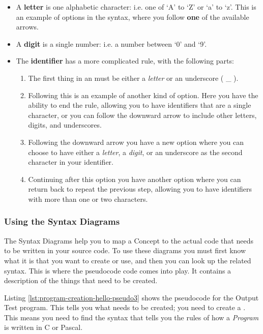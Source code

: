 \begin{itemize}
  \item A \textbf{letter} is one alphabetic character: i.e. one of `A' to `Z' or `a' to `z'. This is an example of options in the syntax, where you follow \textbf{one} of the available arrows.
  \item A \textbf{digit} is a single number: i.e. a number between `0' and `9'.
  
  \item The \textbf{identifier} has a more complicated rule, with the following parts:
  \begin{enumerate}
    \item The first thing in an  must be either a \emph{letter} or an underscore ( \_ ).
    \item Following this is an example of another kind of option. Here you have the ability to end the rule, allowing you to have identifiers that are a single character, or you can follow the downward arrow to include other letters, digits, and underscores.
    \item Following the downward arrow you have a new option where you can choose to have either a \emph{letter}, a \emph{digit}, or an underscore as the second character in your identifier.
    \item Continuing after this option you have another option where you can return back to repeat the previous step, allowing you to have identifiers with more than one or two characters.
  \end{enumerate}
\end{itemize}

\subsubsection{Using the Syntax Diagrams} %
\label{ssub:using_the_syntax_diagrams}

The Syntax Diagrams help you to map a Concept to the actual code that needs to be written in your source code. To use these diagrams you must first know what it is that you want to create or use, and then you can look up the related syntax. This is where the pseudocode code comes into play. It contains a description of the things that need to be created. 

Listing \ref{lst:program-creation-hello-pseudo3} shows the pseudocode for the Output Test program. This tells you what needs to be created; you need to create a . This means you need to find the syntax that tells you the rules of how a \emph{Program} is written in C or Pascal. 

